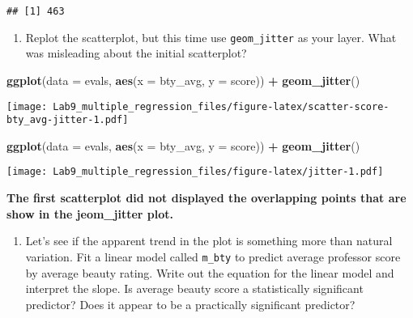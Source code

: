 \documentclass[
]{article}
\newenvironment{Shaded}{\begin{snugshade}}{\end{snugshade}}
\newcommand{\AttributeTok}[1]{\textcolor[rgb]{0.13,0.29,0.53}{#1}}
\newcommand{\FunctionTok}[1]{\textcolor[rgb]{0.13,0.29,0.53}{\textbf{#1}}}
\newcommand{\NormalTok}[1]{#1}
\newcommand{\SpecialCharTok}[1]{\textcolor[rgb]{0.81,0.36,0.00}{\textbf{#1}}}
\providecommand{\tightlist}{%
  \setlength{\itemsep}{0pt}\setlength{\parskip}{0pt}}
\begin{document}
\begin{verbatim}
## [1] 463
\end{verbatim}

\begin{enumerate}
\def\labelenumi{\arabic{enumi}.}
\setcounter{enumi}{3}
\tightlist
\item
  Replot the scatterplot, but this time use \texttt{geom\_jitter} as
  your layer. What was misleading about the initial scatterplot?
\end{enumerate}

\begin{Shaded}
\begin{Highlighting}[]
\FunctionTok{ggplot}\NormalTok{(}\AttributeTok{data =}\NormalTok{ evals, }\FunctionTok{aes}\NormalTok{(}\AttributeTok{x =}\NormalTok{ bty\_avg, }\AttributeTok{y =}\NormalTok{ score)) }\SpecialCharTok{+}
  \FunctionTok{geom\_jitter}\NormalTok{()}
\end{Highlighting}
\end{Shaded}

\texttt{[image: Lab9\_multiple\_regression\_files/figure-latex/scatter-score-bty\_avg-jitter-1.pdf]}

\begin{Shaded}
\begin{Highlighting}[]
\FunctionTok{ggplot}\NormalTok{(}\AttributeTok{data =}\NormalTok{ evals, }\FunctionTok{aes}\NormalTok{(}\AttributeTok{x =}\NormalTok{ bty\_avg, }\AttributeTok{y =}\NormalTok{ score)) }\SpecialCharTok{+}
  \FunctionTok{geom\_jitter}\NormalTok{()}
\end{Highlighting}
\end{Shaded}

\texttt{[image: Lab9\_multiple\_regression\_files/figure-latex/jitter-1.pdf]}

\textbf{The first scatterplot did not displayed the overlapping points
that are show in the jeom\_jitter plot.}

\begin{enumerate}
\def\labelenumi{\arabic{enumi}.}
\setcounter{enumi}{4}
\tightlist
\item
  Let's see if the apparent trend in the plot is something more than
  natural variation. Fit a linear model called \texttt{m\_bty} to
  predict average professor score by average beauty rating. Write out
  the equation for the linear model and interpret the slope. Is average
  beauty score a statistically significant predictor? Does it appear to
  be a practically significant predictor?
\end{enumerate}
\end{document}
